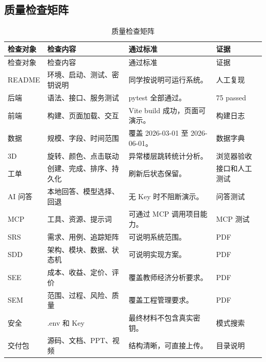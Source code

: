 \documentclass[12pt,a4paper]{ctexart}
\begin{document}
\subsection{质量检查矩阵}
\begin{longtable}{L{2.4cm}L{4.0cm}L{4.5cm}L{3.5cm}}
\caption{质量检查矩阵}\\
\toprule
检查对象 & 检查内容 & 通过标准 & 证据 \\
\midrule
\endfirsthead
\toprule
检查对象 & 检查内容 & 通过标准 & 证据 \\
\midrule
\endhead
README & 环境、启动、测试、密钥说明 & 同学按说明可运行系统。 & 人工复现 \\
后端 & 语法、接口、服务测试 & pytest 全部通过。 & 75 passed \\
前端 & 构建、页面加载、交互 & Vite build 成功，页面可演示。 & 构建日志 \\
数据 & 规模、字段、时间范围 & 覆盖 2026-03-01 至 2026-06-01。 & 数据字典 \\
3D & 旋转、颜色、点击联动 & 异常楼层跳转统计分析。 & 浏览器验收 \\
工单 & 创建、完成、排序、持久化 & 刷新后状态保留。 & 接口和人工测试 \\
AI 问答 & 本地回答、模型选择、回退 & 无 Key 时不阻断演示。 & 问答测试 \\
MCP & 工具、资源、提示词 & 可通过 MCP 调用项目能力。 & MCP 测试 \\
SRS & 需求、用例、追踪矩阵 & 可说明系统范围。 & PDF \\
SDD & 架构、模块、数据、状态机 & 可说明实现方案。 & PDF \\
SEE & 成本、收益、定价、评价 & 覆盖教师经济分析要求。 & PDF \\
SEM & 范围、过程、风险、质量 & 覆盖工程管理要求。 & PDF \\
安全 & .env 和 Key & 最终材料不包含真实密钥。 & 模式搜索 \\
交付包 & 源码、文档、PPT、视频 & 结构清晰，可直接上传。 & 目录说明 \\
\bottomrule
\end{longtable}
\end{document}
